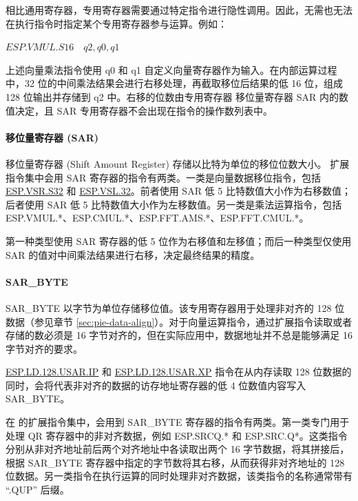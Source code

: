 \documentclass[main\_\_CN.tex]{subfiles}
\begin{document}
相比通用寄存器，专用寄存器需要通过特定指令进行隐性调用。因此，无需也无法在执行指令时指定某个专用寄存器参与运算。例如：

\begin{center}
    $\hyperref[instruction:ESPVMULS16]{ESP.VMUL.S16} \hspace{1em} q2, q0, q1$
\end{center}

上述向量乘法指令使用 q0 和 q1 自定义向量寄存器作为输入。在内部运算过程中，32 位的中间乘法结果会进行右移处理，再截取移位后结果的低 16 位，组成 128 位输出并存储到 q2 中。右移的位数由专用寄存器 移位量寄存器 SAR 内的数值决定，且 SAR 专用寄存器不会出现在指令的操作数列表中。


\paragraph{移位量寄存器 (SAR)}

移位量寄存器 (Shift Amount Register) 存储以比特为单位的移位位数大小。\chipname{} 扩展指令集中会用 SAR 寄存器的指令有两类。一类是向量数据移位指令，包括 \hyperref[instruction:ESPVSRS32]{ESP.VSR.S32} 和 \hyperref[instruction:ESPVSL32]{ESP.VSL.32}。前者使用 SAR 低 5 比特数值大小作为右移数值；后者使用 SAR 低 5 比特数值大小作为左移数值。另一类是乘法运算指令，包括 ESP.VMUL.*、ESP.CMUL.*、ESP.FFT.AMS.*、ESP.FFT.CMUL.*。

第一种类型使用 SAR 寄存器的低 5 位作为右移值和左移值；而后一种类型仅使用 SAR 的值对中间乘法结果进行右移，决定最终结果的精度。

\paragraph{SAR\_BYTE}

SAR\_BYTE 以字节为单位存储移位值。该专用寄存器用于处理非对齐的 128 位数据（参见章节 \ref{sec:pie-data-align}）。对于向量运算指令，通过扩展指令读取或者存储的数必须是 16 字节对齐的，但在实际应用中，数据地址并不总是能够满足 16 字节对齐的要求。

\hyperref[instruction:ESPLD128USARIP]{ESP.LD.128.USAR.IP} 和 \hyperref[instruction:ESPLD128USARXP]{ESP.LD.128.USAR.XP} 指令在从内存读取 128 位数据的同时，会将代表非对齐的数据的访存地址寄存器的低 4 位数值内容写入 SAR\_BYTE。

在 \chipname{} 的扩展指令集中，会用到 SAR\_BYTE 寄存器的指令有两类。第一类专门用于处理 QR 寄存器中的非对齐数据，例如 ESP.SRCQ.* 和 ESP.SRC.Q*。这类指令分别从非对齐地址前后两个对齐地址中各读取出两个 16 字节数据，将其拼接后，根据 SAR\_BYTE 寄存器中指定的字节数将其右移，从而获得非对齐地址的 128 位数据。另一类指令在执行运算的同时处理非对齐数据，该类指令的名称通常带有 “.QUP” 后缀。
\end{document}
